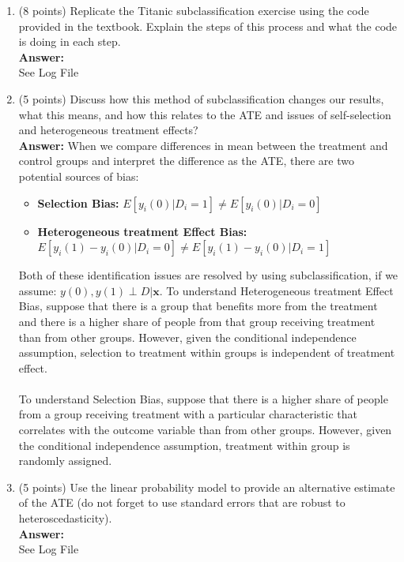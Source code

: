\documentclass[letterpaper,12pt]{article}
\begin{document}
\begin{enumerate}[label=(\alph*)] 
\item (8 points) Replicate the Titanic subclassification exercise using the code provided in the textbook. Explain the steps of this process and what the code is doing in each step.\\
\textbf{Answer:} \\
See Log File 
\item (5 points)  Discuss how this method of subclassification changes our results, what this means, and how this relates to the ATE and issues of self-selection and heterogeneous treatment effects?\\
\textbf{Answer:}  When we compare differences in mean between the treatment and control groups and interpret the difference as the ATE, there are two potential sources of bias:
\begin{itemize}
\item \textbf{Selection Bias:} $E[y_i(0)|D_i=1] \neq E[y_i(0)|D_i=0]$
\item \textbf{Heterogeneous treatment Effect Bias: } $E[y_i(1)-y_i(0)|D_i=0]  \neq  E[y_i(1)-y_i(0)|D_i=1]$
\end{itemize}
Both of these identification issues are resolved by using subclassification, if we assume: $y(0),y(1) \perp D|\bm{x}$. To understand Heterogeneous treatment Effect Bias, suppose that there is a group that benefits more from the treatment and there is a higher share of people from that group receiving treatment than from other groups. However, given the conditional independence assumption, selection to treatment within groups is independent of treatment effect.  \\
\\
To understand Selection Bias, suppose that there is a higher share of people from a group receiving treatment with a particular characteristic that correlates with the outcome variable than from other groups. However, given the conditional independence assumption, treatment within group is randomly assigned.    
  

\item (5 points) Use the linear probability model to provide an alternative estimate of the ATE (do not forget to use standard errors that are robust to heteroscedasticity). \\
\textbf{Answer:} \\
See Log File 


\end{enumerate}
\end{document}
